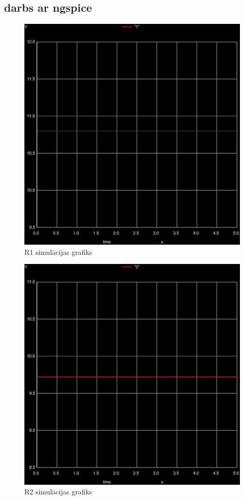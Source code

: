\documentclass{report}
\begin{document}
\subsection{darbs ar ngspice}
 \begin{figure}[!htb]
    \centering
        \includegraphics[scale=0.6]{011.ps}
        \caption{R1 simulācijas grafiks}
    \end{figure} \newpage
    
     \begin{figure}[!htb]
    \centering
        \includegraphics[scale=0.6]{012.ps}
        \caption{R2 simulācijas grafiks}
    \end{figure} \newpage
\end{document}
